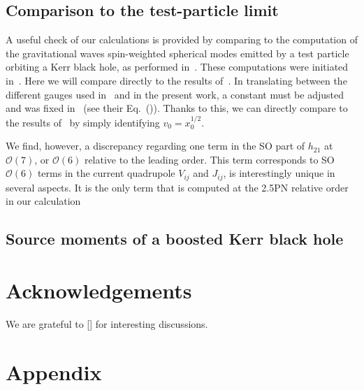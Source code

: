 \documentclass[
superscriptaddress,
preprint,
prd,tightenlines,showpacs,nofootinbib,
eqsecnum,
amsfonts,amsmath,amssymb]{revtex4-1}
\newcommand{\calO}{\mathcal{O}}
\begin{document}

\subsection{Comparison to the test-particle limit}
\label{subsec:testparticle}

A useful check of our calculations is provided by comparing to the computation of the gravitational waves spin-weighted spherical modes emitted by a test particle orbiting a Kerr black hole, as performed in~\cite{}. These computations were initiated in~\cite{}. Here we will compare directly to the results of~\cite{}. In translating between the different gauges used in~\cite{} and in the present work, a constant must be adjusted and was fixed in~\cite{} (see their Eq.~()). Thanks to this, we can directly compare to the results of~\cite{} by simply identifying $v_{0} = x_{0}^{1/2}$.

We find, however, a discrepancy regarding one term in the SO part of $h_{21}$ at $\calO(7)$, or $\calO(6)$ relative to the leading order. This term corresponds to SO $\calO(6)$ terms in the current quadrupole $V_{ij}$ and $J_{ij}$, is interestingly unique in several aspects. It is the only term that is computed at the 2.5PN relative order in our calculation


\subsection{Source moments of a boosted Kerr black hole}
\label{subsec:Kerrboost}


\section*{Acknowledgements}
We are grateful to [] for interesting discussions.


\appendix


\section{Appendix} \label{app:}



\end{document}

